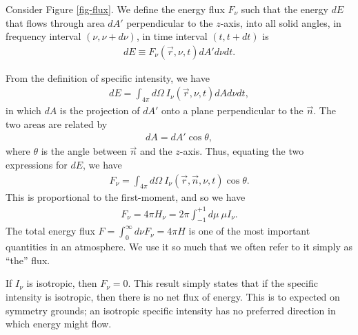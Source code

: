 Consider Figure \ref{fig-flux}. 
We define the energy flux $F_\nu$ such that the energy $dE$ that flows through area
$dA'$ perpendicular to the $z$-axis, into all solid angles, in frequency interval $(\nu,\nu+d\nu)$, in
time interval $(t,t+dt)$ is
\begin{align}
dE \equiv F_\nu(\vec r, \nu, t) dA' d\nu dt.
\end{align}

\newslide

From the definition of
specific intensity, 
we have
\begin{align}
dE = 
\int_{4\pi}\!\!\!d\Omega\:
I_\nu(\vec r, \nu, t) dA d\nu dt,
\end{align}
in which $dA$ is the projection of $dA'$ onto a plane perpendicular to the $\vec n$. 
The two areas
are related by
\begin{align}
dA = dA' \cos\theta,
\end{align}
where $\theta$ is the angle between $\vec n$ and the
$z$-axis. Thus, equating the two expressions for $dE$, we have
\begin{align}
F_\nu = \int_{4\pi}\!\!\!d\Omega\:
I_\nu(\vec r, \vec n, \nu, t) \cos\theta.
\end{align}
This is proportional to the first-moment, and so we have
\begin{align}
F_\nu = 4\pi H_\nu =
2\pi \int_{-1}^{+1}\!\!\!d\mu\:\mu I_\nu.
\end{align}
The total energy flux $F = \int_0^\infty\!\!\!d\nu F_\nu = 4\pi H$ is
one of the most important quantities in an atmosphere. We use it so much that we often refer to it simply as ``the'' flux.

\newslide

If $I_\nu$ is isotropic, then $F_\nu = 0$. This result simply states
that if the specific intensity is isotropic, then there is no net flux
of energy. This is to expected on symmetry grounds; an isotropic
specific intensity has no preferred direction in which energy might flow.

\newslide


